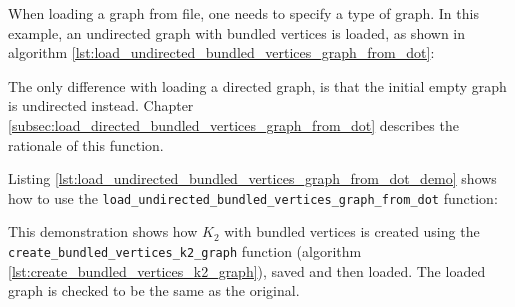 When loading a graph from file, one needs to specify a type of graph.
In this example, an undirected graph with bundled vertices is loaded, as
shown in algorithm 
\ref{lst:load_undirected_bundled_vertices_graph_from_dot}:



The only difference with loading a directed graph, is that the initial empty
graph is undirected instead.
Chapter \ref{subsec:load_directed_bundled_vertices_graph_from_dot}
describes the rationale of this function.

Listing \ref{lst:load_undirected_bundled_vertices_graph_from_dot_demo}
shows how to use the \verb;load_undirected_bundled_vertices_graph_from_dot;
function:



This demonstration shows how $K_{2}$
with bundled vertices is created using the \verb;create_bundled_vertices_k2_graph;
function (algorithm \ref{lst:create_bundled_vertices_k2_graph}), 
saved and then loaded.
The loaded graph is checked to be the same as the original.


